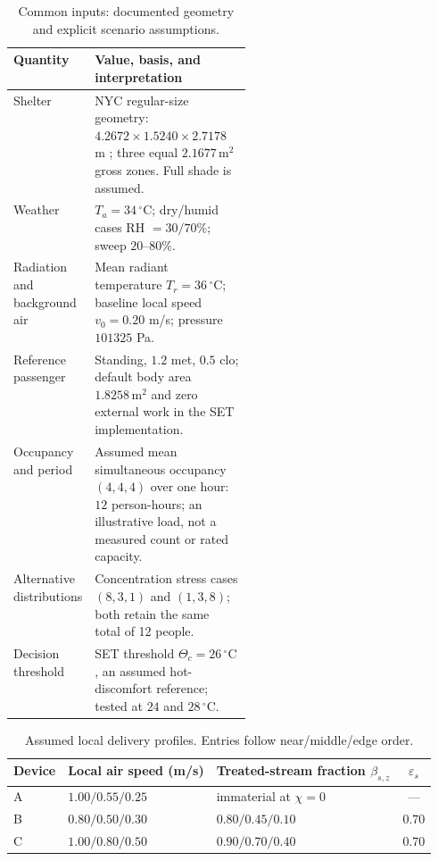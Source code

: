 \documentclass[12pt]{article}
\begin{document}
\begin{table}[!ht]
\centering\small
\caption{Common inputs: documented geometry and explicit scenario assumptions.}
\label{tab:bus-assumptions}
\renewcommand{\arraystretch}{1.12}
\begin{tabularx}{\linewidth}{@{}p{0.31\linewidth}X@{}}
\toprule
Quantity & Value, basis, and interpretation\\
\midrule
Shelter & NYC regular-size geometry: $4.2672\times1.5240\times2.7178$ m \cite{nycshelter}; three equal $2.1677\,\mathrm{m^2}$ gross zones. Full shade is assumed.\\
Weather & $T_a=34\,^{\circ}\mathrm C$; dry/humid cases RH $=30/70\%$; sweep $20$--$80\%$.\\
Radiation and background air & Mean radiant temperature $T_r=36\,^{\circ}\mathrm C$; baseline local speed $v_0=0.20$ m/s; pressure $101325$ Pa.\\
Reference passenger & Standing, $1.2$ met, $0.5$ clo; default body area $1.8258\,\mathrm{m^2}$ and zero external work in the SET implementation.\\
Occupancy and period & Assumed mean simultaneous occupancy $(4,4,4)$ over one hour: $12$ person-hours; an illustrative load, not a measured count or rated capacity.\\
Alternative distributions & Concentration stress cases $(8,3,1)$ and $(1,3,8)$; both retain the same total of 12 people.\\
Decision threshold & SET threshold $\Theta_c=26\,^{\circ}\mathrm C$, an assumed hot-discomfort reference; tested at $24$ and $28\,^{\circ}\mathrm C$.\\
\bottomrule
\end{tabularx}
\end{table}

\begin{table}[!ht]
\centering\small
\caption{Assumed local delivery profiles. Entries follow near/middle/edge order.}
\label{tab:bus-fields}
\begin{tabularx}{\linewidth}{@{}lXXc@{}}
\toprule
Device & Local air speed (m/s) & Treated-stream fraction $\beta_{s,z}$ & $\varepsilon_s$\\
\midrule
A & $1.00 / 0.55 / 0.25$ & immaterial at $\chi=0$ & ---\\
B & $0.80 / 0.50 / 0.30$ & $0.80 / 0.45 / 0.10$ & $0.70$\\
C & $1.00 / 0.80 / 0.50$ & $0.90 / 0.70 / 0.40$ & $0.70$\\
\bottomrule
\end{tabularx}
\end{table}
\end{document}
